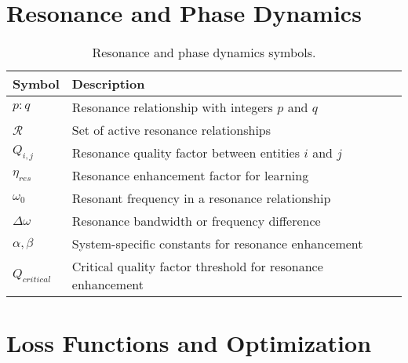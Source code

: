 \section{Resonance and Phase Dynamics}

\begin{table}[h]
\centering
\begin{tabular}{|l|p{10cm}|}
\hline
\textbf{Symbol} & \textbf{Description} \\
\hline
$p:q$ & Resonance relationship with integers $p$ and $q$ \\
\hline
$\mathcal{R}$ & Set of active resonance relationships \\
\hline
$Q_{i,j}$ & Resonance quality factor between entities $i$ and $j$ \\
\hline
$\eta_{res}$ & Resonance enhancement factor for learning \\
\hline
$\omega_0$ & Resonant frequency in a resonance relationship \\
\hline
$\Delta \omega$ & Resonance bandwidth or frequency difference \\
\hline
$\alpha, \beta$ & System-specific constants for resonance enhancement \\
\hline
$Q_{critical}$ & Critical quality factor threshold for resonance enhancement \\
\hline
\end{tabular}
\caption{Resonance and phase dynamics symbols.}
\label{tab:symbols_resonance}
\end{table}

\section{Loss Functions and Optimization}

